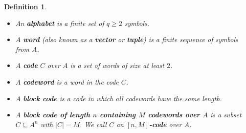 \documentclass[10pt]{article}
\theoremstyle{newstyle}
\newtheorem{defn}[thm]{Definition}
\begin{document}
\begin{defn}~
\begin{itemize}
    \item An {\bf alphabet} is a finite set of $q \geq 2$ symbols.
    \item A {\bf word} (also known as a {\bf vector} or {\bf tuple}) 
    is a finite sequence of symbols from $A$.
    \item A {\bf code} $C$ over $A$ is a set of words of size at least $2$.
    \item A {\bf codeword} is a word in the code $C$.
    \item A {\bf block code} is a code in which all codewords have the same length.
    \item A {\bf block code of length $n$ containing $M$ codewords over $A$} is a 
    subset $C \subseteq A^n$ with $|C| = M$. We call $C$ an {\bf $[n, M]$-code} over $A$.
\end{itemize}
\end{defn}
\end{document}
